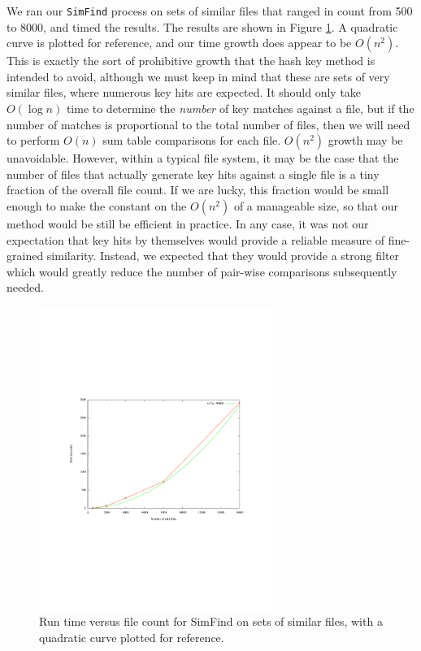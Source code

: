 \documentclass[10pt, twocolumn]{article}
\begin{document}
We ran our {\tt SimFind} process on sets of similar files that ranged in count from 500 to 8000, and timed the results.  The results are shown in Figure \ref{performanceTest}.  A quadratic curve is plotted for reference, and our time growth does appear to be $O(n^2)$.  This is exactly the sort of prohibitive growth that the hash key method is intended to avoid, although we must keep in mind that these are sets of very similar files, where numerous key hits are expected.  It should only take $O(\log n)$ time to determine the {\it number} of key matches against a file, but if the number of matches is proportional to the total number of files, then we will need to perform $O(n)$ sum table comparisons for each file.  $O(n^2)$ growth may be unavoidable.  However, within a typical file system, it may be the case that the number of files that actually generate key hits against a single file is a tiny fraction of the overall file count.  If we are lucky, this fraction would be small enough to make the constant on the $O(n^2)$ of a manageable size, so that our method would be still be efficient in practice.  In any case, it was not our expectation that key hits by themselves would provide a reliable measure of fine-grained similarity.  Instead, we expected that they would provide a strong filter which would greatly reduce the number of pair-wise comparisons subsequently needed.

 \begin{figure}[t] 
 \centering
\includegraphics[width= 3in]{performance.pdf}
\caption{Run time versus file count for SimFind on sets of similar files, with a quadratic curve plotted for reference.}
\label{performanceTest}
\end{figure}
\end{document}

